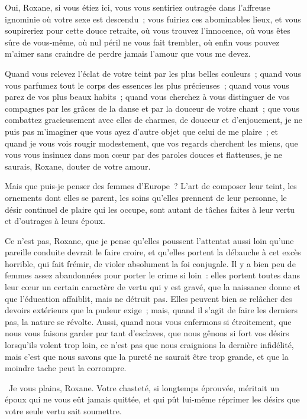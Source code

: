 \documentclass[french,twoside]{book} %
\begin{document}
Oui, Roxane, si vous étiez ici, vous vous sentiriez outragée dans l’affreuse ignominie où votre sexe est descendu ; vous fuiriez ces abominables lieux, et vous soupireriez pour cette douce retraite, où vous trouvez l’innocence, où vous êtes sûre de vous-même, où nul péril ne vous fait trembler, où enfin vous pouvez m’aimer sans craindre de perdre jamais l’amour que vous me devez.\par
Quand vous relevez l’éclat de votre teint par les plus belles couleurs ; quand vous vous parfumez tout le corps des essences les plus précieuses ; quand vous vous parez de vos plus beaux habits ; quand vous cherchez à vous distinguer de vos compagnes par les grâces de la danse et par la douceur de votre chant ; que vous combattez gracieusement avec elles de charmes, de douceur et d’enjouement, je ne puis pas m’imaginer que vous ayez d’autre objet que celui de me plaire ; et quand je vous vois rougir modestement, que vos regards cherchent les miens, que vous vous insinuez dans mon cœur par des paroles douces et flatteuses, je ne saurais, Roxane, douter de votre amour.\par
Mais que puis-je penser des femmes d’Europe ? L’art de composer leur teint, les ornements dont elles se parent, les soins qu’elles prennent de leur personne, le désir continuel de plaire qui les occupe, sont autant de tâches faites à leur vertu et d’outrages à leurs époux.\par
Ce n’est pas, Roxane, que je pense qu’elles poussent l’attentat aussi loin qu’une pareille conduite devrait le faire croire, et qu’elles portent la débauche à cet excès horrible, qui fait frémir, de violer absolument la foi conjugale. Il y a bien peu de femmes assez abandonnées pour porter le crime si loin : elles portent toutes dans leur cœur un certain caractère de vertu qui y est gravé, que la naissance donne et que l’éducation affaiblit, mais ne détruit pas. Elles peuvent bien se relâcher des devoirs extérieurs que la pudeur exige ; mais, quand il s’agit de faire les derniers pas, la nature se révolte. Aussi, quand nous vous enfermons si étroitement, que nous vous faisons garder par tant d’esclaves, que nous gênons si fort vos désirs lorsqu’ils volent trop loin, ce n’est pas que nous craignions la dernière infidélité, mais c’est que nous savons que la pureté ne saurait être trop grande, et que la moindre tache peut la corrompre.\par
 Je vous plains, Roxane. Votre chasteté, si longtemps éprouvée, méritait un époux qui ne vous eût jamais quittée, et qui pût lui-même réprimer les désirs que votre seule vertu sait soumettre.\par
\end{document}

